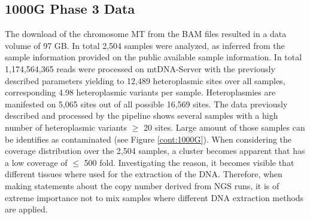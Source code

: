\subsection{1000G Phase 3 Data}
The download of the chromosome MT from the BAM files resulted in a data volume of 97 GB. In total 2,504 samples were analyzed, as inferred from the sample information provided on the public available sample information. In total 1,174,564,365 reads were processed on mtDNA-Server with the previously described parameters yielding to 12,489 heteroplasmic sites over all samples, corresponding 4.98 heteroplasmic variants per sample. Heteroplasmies are manifested on 5,065 sites out of all possible 16,569 sites. 
The data previously described and processed by the pipeline shows several samples with a high number of heteroplasmic variants $\geq$ 20 sites. Large amount of those samples can be identifies as contaminated (see Figure \ref{cont:1000G}). When considering the coverage distribution over the 2,504 samples, a cluster becomes apparent that has a low coverage of $\leq$ 500 fold. Investigating the reason, it becomes visible that different tissues where used for the extraction of the DNA. Therefore, when making statements about the copy number derived from NGS runs, it is of extreme importance not to mix samples where different DNA extraction methods are applied.


